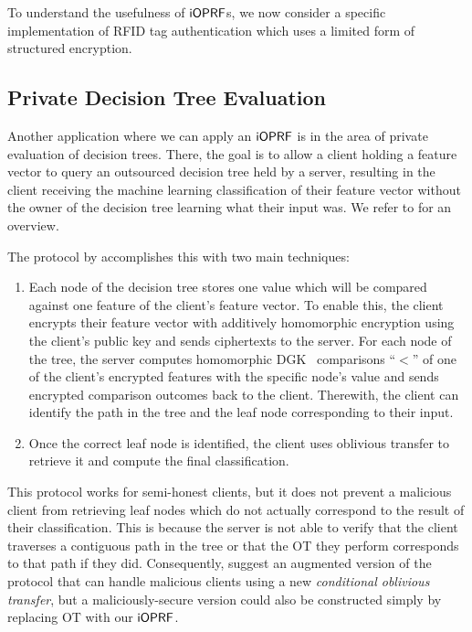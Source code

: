 To understand the usefulness of $\mathsf{i}\mathsf{OPRF}$s, we now
consider a specific implementation of RFID tag authentication which
uses a limited form of structured encryption.





\subsection{Private Decision Tree Evaluation}
Another application where we can apply an $\mathsf{i}\mathsf{OPRF}$ is in the area of
private evaluation of decision trees.  There, the goal is to allow a
client holding a feature vector to query an outsourced decision tree
held by a server, resulting in the client receiving the machine
learning classification of their feature vector without the owner of
the decision tree learning what their input was. We refer to
\citet{schneidertree} for an overview.

The protocol by \citet{wu2016privately} accomplishes this with two
main techniques:

\begin{enumerate}[leftmargin=*]
\item Each node of the decision tree stores one value which will be
  compared against one feature of the client's feature vector.  To
  enable this, the client encrypts their feature vector with
  additively homomorphic encryption using the client's public key and
  sends ciphertexts to the server.  For each node of the tree, the
  server computes homomorphic DGK~\cite{dgk} comparisons ``$<$'' of
  one of the client's encrypted features with the specific node's
  value and sends encrypted comparison outcomes back to the client.
  Therewith, the client can identify the path in the tree and the leaf
  node corresponding to their input.

\item Once the correct leaf node is identified, the client uses
  oblivious transfer to retrieve it and compute the final
  classification.
\end{enumerate}

This protocol works for semi-honest clients, but it does not prevent
a malicious client from retrieving leaf nodes which do not actually
correspond to the result of their classification.  This is because the
server is not able to verify that the client traverses a contiguous
path in the tree or that the OT they perform corresponds to that path
if they did.
Consequently, \citeauthor{wu2016privately} suggest an augmented
version of the protocol that can handle malicious clients using a new
\emph{conditional oblivious transfer}, but a maliciously-secure
version could also be constructed simply by replacing OT with our
$\mathsf{i}\mathsf{OPRF}$.


